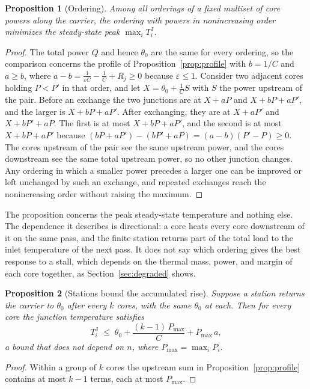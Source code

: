 \documentclass[11pt]{article}
\theoremstyle{definition}
\theoremstyle{plain}
\newtheorem{proposition}{Proposition}[section]
\theoremstyle{remark}
\begin{document}
\begin{proposition}[Ordering]\label{prop:order}
Among all orderings of a fixed multiset of core powers along the carrier, the ordering with powers in nonincreasing order minimizes the steady-state peak $\max_i T^{\mathrm J}_i$.
\end{proposition}
\begin{proof}
The total power $Q$ and hence $\theta_0$ are the same for every ordering, so the comparison concerns the profile of Proposition~\ref{prop:profile} with $b=1/C$ and $a\ge b$, where $a-b=\frac{1}{\varepsilon C}-\frac1C+R_j\ge0$ because $\varepsilon\le1$. Consider two adjacent cores holding $P<P'$ in that order, and let $X=\theta_0+\frac1C S$ with $S$ the power upstream of the pair. Before an exchange the two junctions are at $X+aP$ and $X+bP+aP'$, and the larger is $X+bP+aP'$. After exchanging, they are at $X+aP'$ and $X+bP'+aP$. The first is at most $X+bP+aP'$, and the second is at most $X+bP+aP'$ because $(bP+aP')-(bP'+aP)=(a-b)(P'-P)\ge0$. The cores upstream of the pair see the same upstream power, and the cores downstream see the same total upstream power, so no other junction changes. Any ordering in which a smaller power precedes a larger one can be improved or left unchanged by such an exchange, and repeated exchanges reach the nonincreasing order without raising the maximum.
\end{proof}

The proposition concerns the peak steady-state temperature and nothing else. The dependence it describes is directional: a core heats every core downstream of it on the same pass, and the finite station returns part of the total load to the inlet temperature of the next pass. It does not say which ordering gives the best response to a stall, which depends on the thermal mass, power, and margin of each core together, as Section~\ref{sec:degraded} shows.

\begin{proposition}[Stations bound the accumulated rise]\label{prop:stations}
Suppose a station returns the carrier to $\theta_0$ after every $k$ cores, with the same $\theta_0$ at each. Then for every core the junction temperature satisfies
\[
T^{\mathrm J}_i \;\le\; \theta_0+\frac{(k-1)\,P_{\max}}{C}+P_{\max}\,a,
\]
a bound that does not depend on $n$, where $P_{\max}=\max_iP_i$.
\end{proposition}
\begin{proof}
Within a group of $k$ cores the upstream sum in Proposition~\ref{prop:profile} contains at most $k-1$ terms, each at most $P_{\max}$.
\end{proof}
\end{document}
